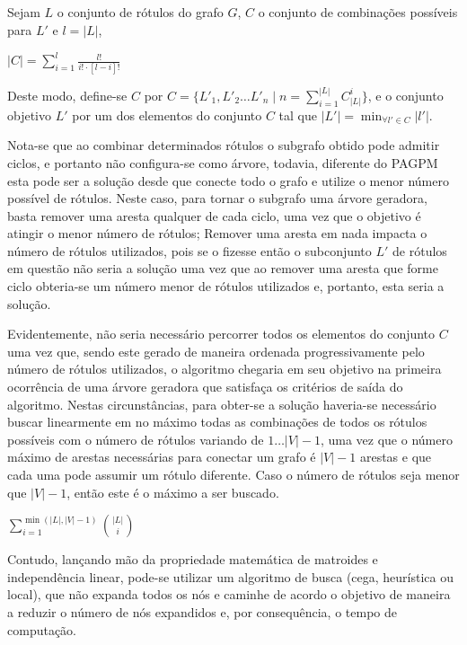 \documentclass[12pt]{article}
\begin{document}
	Sejam $L$ o conjunto de rótulos do grafo $G$, $C$ o conjunto de combinações possíveis para $L'$ e $l = |L|$,

	\begin{center}
	$\displaystyle{|C| = \sum_{i = 1}^{l}{\frac {l!}{i! \cdot [l-i]!}}}$
	\end{center}

	Deste modo, define-se $C$ por $\displaystyle{C = \{L'_1, L'_2 \dots L'_n \mid n = \sum_{i = 1}^{|L|}{C_{|L|}^{i}}\}}$, e o conjunto objetivo $L'$ por um dos elementos do conjunto $C$ tal que $\displaystyle{|L'| = \min_{\forall l' \in C} |l'|}$.

	Nota-se que ao combinar determinados rótulos o subgrafo obtido pode admitir ciclos, e portanto não configura-se como árvore, todavia, diferente do PAGPM esta pode ser a solução desde que conecte todo o grafo e utilize o menor número possível de rótulos. Neste caso, para tornar o subgrafo uma árvore geradora, basta remover uma aresta qualquer de cada ciclo, uma vez que o objetivo é atingir o menor número de rótulos; Remover uma aresta em nada impacta o número de rótulos utilizados, pois se o fizesse então o subconjunto $L'$ de rótulos em questão não seria a solução uma vez que ao remover uma aresta que forme ciclo obteria-se um número menor de rótulos utilizados e, portanto, esta seria a solução.

	Evidentemente, não seria necessário percorrer todos os elementos do conjunto $C$ uma vez que, sendo este gerado de maneira ordenada progressivamente pelo número de rótulos utilizados, o algoritmo chegaria em seu objetivo na primeira ocorrência de uma árvore geradora que satisfaça os critérios de saída do algoritmo. Nestas circunstâncias, para obter-se a solução haveria-se necessário buscar linearmente em no máximo todas as combinações de todos os rótulos possíveis com o número de rótulos variando de $1 \dots |V| - 1$, uma vez que o número máximo de arestas necessárias para conectar um grafo é $|V| - 1$ arestas e que cada uma pode assumir um rótulo diferente. Caso o número de rótulos seja menor que $|V| - 1$, então este é o máximo a ser buscado.

	\begin{center}
	$\displaystyle{\sum_{i = 1}^{\min (|L|, |V| - 1)}{|L| \choose i}}$
	\end{center}

	Contudo, lançando mão da propriedade matemática de matroides e independência linear, pode-se utilizar um algoritmo de busca (cega, heurística ou local), que não expanda todos os nós e caminhe de acordo o objetivo de maneira a reduzir o número de nós expandidos e, por consequência, o tempo de computação.
\end{document}
